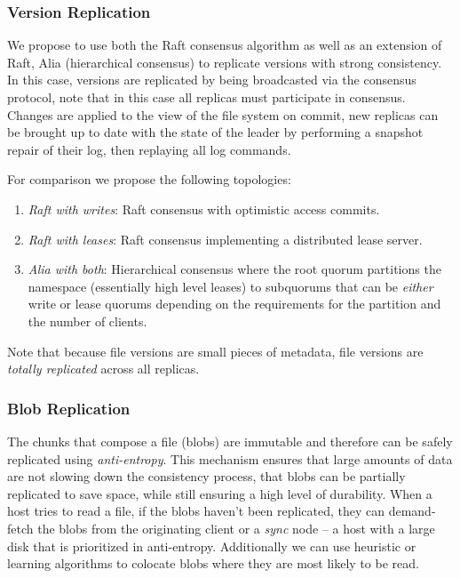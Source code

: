 \documentclass[letterpaper,twocolumn,10pt]{article}
\begin{document}
\subsubsection*{Version Replication}

We propose to use both the Raft consensus algorithm as well as an extension
of Raft, Alia (hierarchical consensus) to replicate versions with strong
consistency.
In this case, versions are replicated by being broadcasted via the consensus
protocol, note that in this case all replicas must participate in consensus.
Changes are applied to the view of the file system on commit, new replicas
can be brought up to date with the state of the leader by performing a
snapshot repair of their log, then replaying all log commands.

For comparison we propose the following topologies:

\begin{enumerate}
    \item \textit{Raft with writes}: Raft consensus with optimistic access
    commits.
    \item \textit{Raft with leases}: Raft consensus implementing a
    distributed lease server.
    \item \textit{Alia with both}: Hierarchical consensus where the root
    quorum partitions the namespace (essentially high level leases) to
    subquorums that can be \textit{either} write or lease quorums depending
    on the requirements for the partition and the number of clients.
\end{enumerate}

Note that because file versions are small pieces of metadata, file versions
are \textit{totally replicated} across all replicas.

\subsubsection*{Blob Replication}

The chunks that compose a file (blobs) are immutable and therefore can be
safely replicated using \textit{anti-entropy}.
This mechanism ensures that large amounts of data are not slowing down the
consistency process, that blobs can be partially replicated to save space,
while still ensuring a high level of durability.
When a host tries to read a file, if the blobs haven't been replicated, they
can demand-fetch the blobs from the originating client or a \textit{sync}
node -- a host with a large disk that is prioritized in anti-entropy.
Additionally we can use heuristic or learning algorithms to colocate blobs
where they are most likely to be read.
\end{document}

